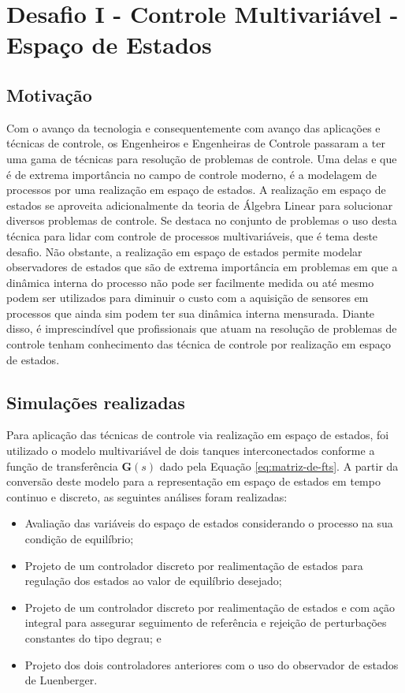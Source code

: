 \section{Desafio I - Controle Multivariável - Espaço de Estados}

\subsection{Motivação}

Com o avanço da tecnologia e consequentemente com avanço das aplicações e
técnicas de controle, os Engenheiros e Engenheiras de Controle passaram a ter
uma gama de técnicas para resolução de problemas de controle. Uma delas e que é
de extrema importância no campo de controle moderno, é a modelagem de processos
por uma realização em espaço de estados. A realização em espaço de estados se
aproveita adicionalmente da teoria de Álgebra Linear para solucionar diversos
problemas de controle. Se destaca no conjunto de problemas o uso desta técnica
para lidar com controle de processos multivariáveis, que é tema deste desafio.
Não obstante, a realização em espaço de estados permite modelar observadores de
estados que são de extrema importância em problemas em que a dinâmica interna do
processo não pode ser facilmente medida ou até mesmo podem ser utilizados para
diminuir o custo com a aquisição de sensores em processos que ainda sim podem
ter sua dinâmica interna mensurada. Diante disso, é imprescindível que
profissionais que atuam na resolução de problemas de controle tenham
conhecimento das técnica de controle por realização em espaço de estados.  

\subsection{Simulações realizadas}

Para aplicação das técnicas de controle via realização em espaço de estados, foi
utilizado o modelo multivariável de dois tanques interconectados conforme a
função de transferência $\mathbf{G}(s)$ dado pela Equação
\ref{eq:matriz-de-fts}. A partir da conversão deste modelo para a representação
em espaço de estados em tempo continuo e discreto, as seguintes análises foram
realizadas:

\begin{itemize}
    \item Avaliação das variáveis do espaço de estados considerando o processo
    na sua condição de equilíbrio;
    \item Projeto de um controlador discreto por realimentação de estados para
    regulação dos estados ao valor de equilíbrio desejado;
    \item Projeto de um controlador discreto por realimentação de estados e com
    ação integral para assegurar seguimento de referência e rejeição de
    perturbações constantes do tipo degrau; e
    \item Projeto dos dois controladores anteriores com o uso do observador de
    estados de Luenberger.
\end{itemize}

